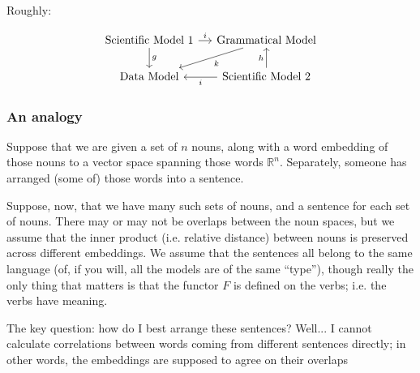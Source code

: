 \documentclass{article}
\theoremstyle{definition}
\begin{document}
Roughly: 

\[
\begin{tikzcd}[column sep=small]
\text{Scientific Model 1} \arrow{r}{i}  \arrow{d}{g} & \text{Grammatical Model} \arrow{dl}{k} \\
\text{Data Model} & \text{Scientific Model 2}  \arrow{l}{i} \arrow{u}{h}
\end{tikzcd}
\]


\subsubsection*{An analogy}
Suppose that we are given a set of $n$ nouns, along with a word embedding of those nouns to a vector space spanning those words $\mathbb{R}^n$. Separately, someone has arranged (some of) those words into a sentence.

Suppose, now, that we have many such sets of nouns, and a sentence for each set of nouns. There may or may not be overlaps between the noun spaces, but we assume that the inner product (i.e. relative distance) between nouns is preserved across different embeddings. We assume that the sentences all belong to the same language (of, if you will, all the models are of the same ``type''), though really the only thing that matters is that the functor $F$ is defined on the verbs; i.e. the verbs have meaning.

The key question: how do I best arrange these sentences? Well... I cannot calculate correlations between words coming from different sentences directly; in other words, the embeddings are supposed to agree on their overlaps %



\end{document}
